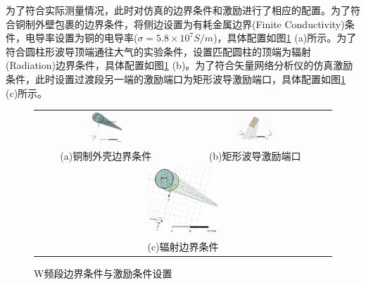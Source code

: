\documentclass[master]{thesis-uestc}
\begin{document}
为了符合实际测量情况，此时对仿真的边界条件和激励进行了相应的配置。为了符合铜制外壁包裹的边界条件，将侧边设置为有耗金属边界(Finite Conductivity)条件，电导率设置为铜的电导率(\(\sigma = 5.8 \times 10 ^ 7 S/m \))，具体配置如图\ref{fig:W频段边界条件与激励条件设置} (a)所示。为了符合圆柱形波导顶端通往大气的实验条件，设置匹配圆柱的顶端为辐射(Radiation)边界条件，具体配置如图\ref{fig:W频段边界条件与激励条件设置} (b)。为了符合矢量网络分析仪的仿真激励条件，此时设置过渡段另一端的激励端口为矩形波导激励端口，具体配置如图\ref{fig:W频段边界条件与激励条件设置} (c)所示。
\begin{figure}[!htbp]
    \small
    \centering
    \begin{tabular}{@{\ }c@{\ }c}
        \includegraphics[width=0.25\textwidth]{pic/chapter5/铜制边界条件.png} & 
        \hspace{5pt}
        \includegraphics[width=0.25\textwidth]{pic/chapter5/矩形波导激励端口.png}     \\
        \mbox{\small (a)铜制外壳边界条件}                                                                               & 
        \mbox{\small (b)矩形波导激励端口}                                                                                  \\[6bp]
        \multicolumn{2}{c}{\includegraphics[width=0.25\textwidth]{pic/chapter5/辐射边界条件.png}} \\  %
        \multicolumn{2}{c}{\mbox{\small (c)辐射边界条件}}
    \end{tabular}
    \caption{W频段边界条件与激励条件设置}
    \label{fig:W频段边界条件与激励条件设置}
\end{figure}
\end{document}
